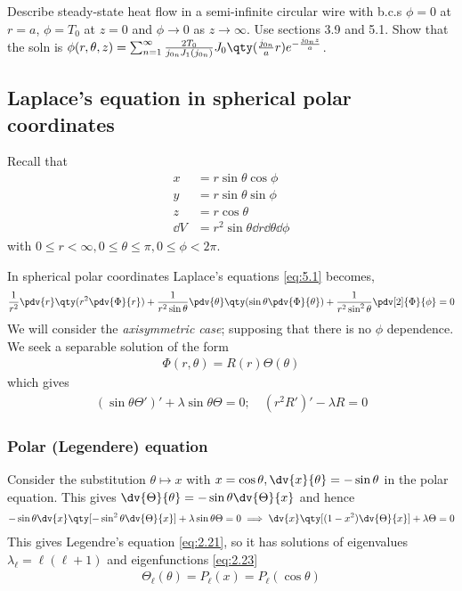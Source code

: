\begin{exercise}
	Describe steady-state heat flow in a semi-infinite circular wire with b.c.s $\phi = 0$ at $r = a$, $\phi = T_0$ at $z = 0$ and $\phi \to 0$ as $z \to \infty$.
	Use sections 3.9 and 5.1.
	Show that the soln is $\phi(r, \theta, z) = \sum_{n=1}^{\infty} \frac{2 T_0}{j_{0n} J_1(j_{0n})} J_0 \qty(\frac{j_{0n}}{a} r) e^{- \frac{j_{0n} z}{a}}$.
\end{exercise} 

\subsection{Laplace's equation in spherical polar coordinates}
Recall that 
\begin{align*}
	x &= r \sin \theta \cos \phi \\
	y &= r \sin \theta \sin \phi \\
	z &= r \cos \theta \\
	\dd{V} &= r^2 \sin \theta \dd{r} \dd{\theta} \dd{\phi}
\end{align*} with $0 \leq r < \infty, 0 \leq \theta \leq \pi, 0 \leq \phi < 2\pi$.

In spherical polar coordinates Laplace's equations \cref{eq:5.1} becomes,
\begin{align} \label{eq:5.12}
	\frac{1}{r^2} \pdv{r} \qty(r^2 \pdv{\Phi}{r}) + \frac{1}{r^2 \sin\theta}\pdv{\theta} \qty(\sin\theta \pdv{\Phi}{\theta}) + \frac{1}{r^2 \sin^2 \theta} \pdv[2]{\Phi}{\phi} = 0
\end{align}
We will consider the \textit{axisymmetric case}; supposing that there is no $\phi$ dependence.
We seek a separable solution of the form
\begin{align*}
	\Phi(r,\theta) = R(r) \Theta(\theta)
\end{align*}
which gives
\begin{align} \label{eq:5.13}
	(\sin\theta \Theta')' + \lambda \sin\theta \Theta = 0;\quad (r^2R')' - \lambda R = 0
\end{align}

\subsubsection{Polar (Legendere) equation}
Consider the substitution $\theta \mapsto x$ with $x = \cos\theta, \dv{x}{\theta} = -\sin\theta$ in the polar equation.
This gives $\dv{\Theta}{\theta} = -\sin\theta \dv{\Theta}{x}$ and hence
\begin{align*}
	-\sin\theta \dv{x}\qty[-\sin^2\theta \dv{\Theta}{x}] + \lambda \sin\theta \Theta = 0 \implies \dv{x}\qty[(1-x^2)\dv{\Theta}{x}] + \lambda \Theta = 0
\end{align*}
This gives Legendre's equation \cref{eq:2.21}, so it has solutions of eigenvalues $\lambda_\ell = \ell (\ell + 1)$ and eigenfunctions \cref{eq:2.23}
\begin{align} \label{eq:5.14}
	\Theta_\ell(\theta) = P_\ell(x) = P_\ell(\cos\theta)
\end{align}

